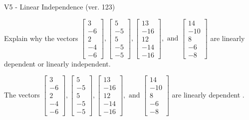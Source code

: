 \begin{exercise}
  \begin{exerciseTitle}V5 - Linear Independence (ver. 123)\end{exerciseTitle}
  \begin{exerciseStatement}
    Explain why the vectors \(\left[\begin{array}{r}
3 \\
-6 \\
2 \\
-4 \\
-6
\end{array}\right] , \left[\begin{array}{r}
5 \\
-5 \\
5 \\
-5 \\
-5
\end{array}\right] , \left[\begin{array}{r}
13 \\
-16 \\
12 \\
-14 \\
-16
\end{array}\right] , \text{ and } \left[\begin{array}{r}
14 \\
-10 \\
8 \\
-6 \\
-8
\end{array}\right]\) are linearly dependent or linearly independent.	


  \end{exerciseStatement}
  \begin{exerciseAnswer}
   The vectors \(\left[\begin{array}{r}
3 \\
-6 \\
2 \\
-4 \\
-6
\end{array}\right] , \left[\begin{array}{r}
5 \\
-5 \\
5 \\
-5 \\
-5
\end{array}\right] , \left[\begin{array}{r}
13 \\
-16 \\
12 \\
-14 \\
-16
\end{array}\right] , \text{ and } \left[\begin{array}{r}
14 \\
-10 \\
8 \\
-6 \\
-8
\end{array}\right]\) are 
  	 linearly dependent  .
  


  \end{exerciseAnswer}
\end{exercise}
